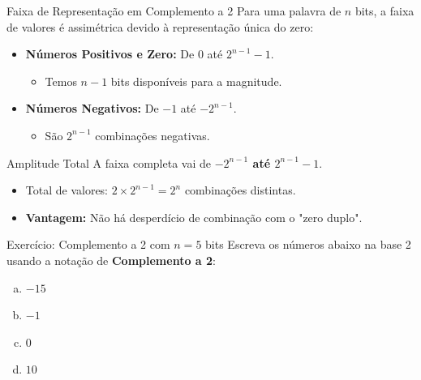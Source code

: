\begin{frame}{Faixa de Representação em Complemento a 2}
    Para uma palavra de $n$ bits, a faixa de valores é assimétrica devido à representação única do zero:

    \begin{itemize}
        \item \textbf{Números Positivos e Zero:} De $0$ até $2^{n-1}-1$.
              \begin{itemize}
                  \item Temos $n-1$ bits disponíveis para a magnitude.
              \end{itemize}
        \item \textbf{Números Negativos:} De $-1$ até $-2^{n-1}$.
              \begin{itemize}
                  \item São $2^{n-1}$ combinações negativas.
              \end{itemize}
    \end{itemize}

    \begin{block}{Amplitude Total}
        A faixa completa vai de \textbf{$-2^{n-1}$ até $2^{n-1}-1$}.
        \begin{itemize}
            \item Total de valores: $2 \times 2^{n-1} = 2^n$ combinações distintas.
            \item \textbf{Vantagem:} Não há desperdício de combinação com o "zero duplo".
        \end{itemize}
    \end{block}
\end{frame}

\begin{frame}{Exercício: Complemento a 2 com $n=5$ bits}
    Escreva os números abaixo na base 2 usando a notação de \textbf{Complemento a 2}:

    \begin{enumerate}[a)]
        \item $-15$
        \item $-1$
        \item $0$
        \item $10$
    \end{enumerate}


\end{frame}

